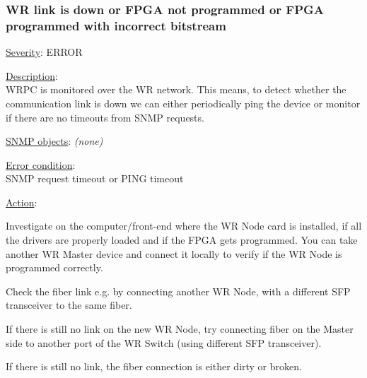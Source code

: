 \subsubsection{\bf WR link is down or FPGA not programmed or FPGA programmed with incorrect bitstream}
		\label{fail:timing:master_down}
		\begin{pck_descr}
			\item [] \underline{Severity}: ERROR
			\item [] \underline{Description}:\\
        WRPC is monitored over the WR network. This means, to detect whether
        the communication link is down we can either periodically ping the
        device or monitor if there are no timeouts from SNMP requests. 
			\item [] \underline{SNMP objects}: \emph{(none)}
			\item [] \underline{Error condition}:\\
				{\footnotesize
				SNMP request timeout or PING timeout}
      \item [] \underline{Action}:
        \begin{pck_proc}
        \item Investigate on the computer/front-end where the WR Node card is
          installed, if all the drivers are properly loaded and if the FPGA gets
          programmed. You can take another WR Master device and connect it
          locally to verify if the WR Node is programmed correctly.
        \item Check the fiber link e.g. by connecting another WR Node, with a
          different SFP transceiver to the same fiber.
        \item If there is still no link on the new WR Node, try connecting
          fiber on the Master side to another port of the WR Switch (using
          different SFP transceiver).
        \item If there is still no link, the fiber connection is either dirty or
          broken.
        \end{pck_proc}
		\end{pck_descr}


